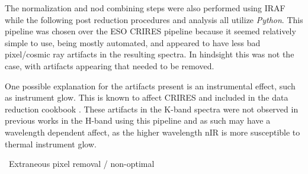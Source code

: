 
The normalization and nod combining steps were also performed using IRAF while the following post reduction procedures and analysis all utilize \emph{Python}. This pipeline was chosen over the ESO CRIRES pipeline because it seemed relatively simple to use, being mostly automated, and appeared to have less bad pixel/cosmic ray artifacts in the resulting spectra. In hindsight this was not the case, with artifacts appearing that needed to be removed. 

One possible explanation for the artifacts present is an instrumental effect, such as instrument glow. This is known to affect CRIRES and included in the data reduction cookbook \citep{smoker_very_2012}. These artifacts in the K-band spectra were not observed in previous works in the H-band using this pipeline and as such may have a wavelength dependent affect, as the higher wavelength nIR is more susceptible to thermal instrument glow.

\ Extraneous pixel removal / non-optimal 

